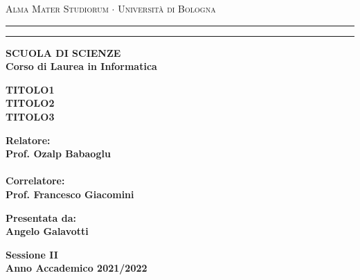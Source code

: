 \documentclass[12pt,a4paper,openright,twoside]{report}
\begin{document}
\begin{titlepage}
	\begin{center}
		{{\Large{\textsc{Alma Mater Studiorum $\cdot$ Università di
							Bologna}}}} \rule[0.1cm]{15.8cm}{0.1mm}
		\rule[0.5cm]{15.8cm}{0.6mm}
		{\small{\bf SCUOLA DI SCIENZE\\
				Corso di Laurea in Informatica }}
	\end{center}
	\vspace{15mm}
	\begin{center}
		{\LARGE{\bf TITOLO1}}\\
		\vspace{3mm}
		{\LARGE{\bf TITOLO2}}\\
		\vspace{3mm}
		{\LARGE{\bf TITOLO3}}\\
	\end{center}
	\vspace{40mm}
	\par
	\noindent
	\begin{minipage}[t]{0.47\textwidth}
		{\large{\bf Relatore:\\
				Prof. Ozalp Babaoglu\\\\
				Correlatore:\\
				Prof. Francesco Giacomini}}
	\end{minipage}
	\hfill
	\begin{minipage}[t]{0.47\textwidth}\raggedleft
		{\large{\bf Presentata da:\\
				Angelo Galavotti}}
	\end{minipage}
	\vspace{20mm}
	\begin{center}
		{\large{\bf Sessione II\\
				Anno Accademico 2021/2022}}
	\end{center}
\end{titlepage}
\end{document}
